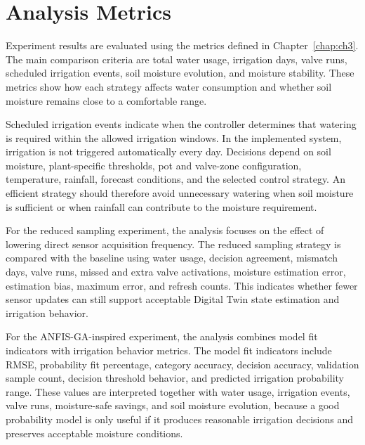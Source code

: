 \section{Analysis Metrics}
\label{sec:ch4sec3}

\par Experiment results are evaluated using the metrics defined in Chapter~\ref{chap:ch3}.
    The main comparison criteria are total water usage, irrigation days, valve runs,
    scheduled irrigation events, soil moisture evolution, and moisture stability. These
    metrics show how each strategy affects water consumption and whether soil moisture
    remains close to a comfortable range.

\par Scheduled irrigation events indicate when the controller determines that watering is
    required within the allowed irrigation windows. In the implemented system, irrigation
    is not triggered automatically every day. Decisions depend on soil moisture,
    plant-specific thresholds, pot and valve-zone configuration, temperature, rainfall,
    forecast conditions, and the selected control strategy. An efficient strategy should
    therefore avoid unnecessary watering when soil moisture is sufficient or when rainfall
    can contribute to the moisture requirement.

\par For the reduced sampling experiment, the analysis focuses on the effect of lowering
    direct sensor acquisition frequency. The reduced sampling strategy is compared with
    the baseline using water usage, decision agreement, mismatch days, valve runs, missed
    and extra valve activations, moisture estimation error, estimation bias, maximum
    error, and refresh counts. This indicates whether fewer sensor updates can still
    support acceptable Digital Twin state estimation and irrigation behavior.

\par For the ANFIS-GA-inspired experiment, the analysis combines model fit indicators with
    irrigation behavior metrics. The model fit indicators include RMSE, probability fit
    percentage, category accuracy, decision accuracy, validation sample count, decision
    threshold behavior, and predicted irrigation probability range. These values are
    interpreted together with water usage, irrigation events, valve runs, moisture-safe
    savings, and soil moisture evolution, because a good probability model is only useful
    if it produces reasonable irrigation decisions and preserves acceptable moisture
    conditions.

